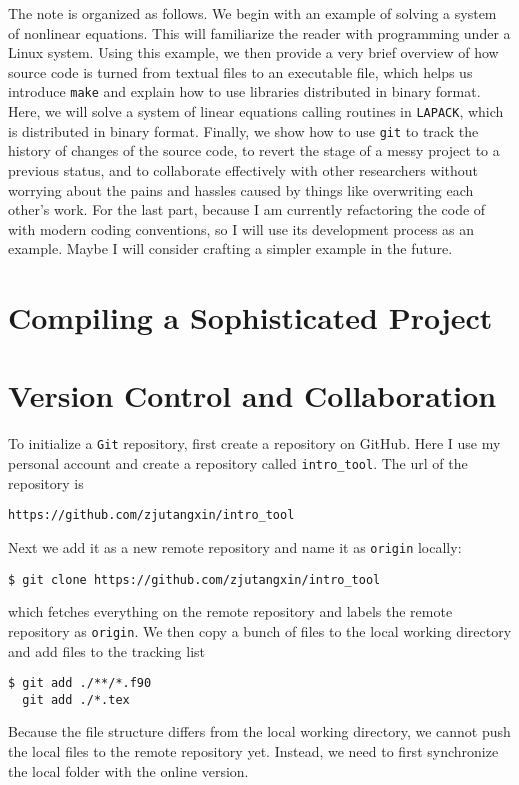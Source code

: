\documentclass[twoside,12pt,leqno]{article}
\newcommand{\code}{\texttt}
\begin{document}
The note is organized as follows. We begin with an example of solving a system of nonlinear equations. This will familiarize the reader with programming under a Linux system. Using this example, we then provide a very brief overview of how source code is turned from textual files to an executable file, which helps us introduce \code{make} and explain how to use libraries distributed in binary format. Here, we will solve a system of linear equations calling routines in \code{LAPACK}, which is distributed in binary format. Finally, we show how to use \code{git} to track the history of changes of the source code, to revert the stage of a messy project to a previous status, and to collaborate effectively with other researchers without worrying about the pains and hassles caused by things like overwriting each other's work. For the last part, because I am currently refactoring the code of \citet{Azzimontietal:2014} with modern coding conventions, so I will use its development process as an example. Maybe I will consider crafting a simpler example in the future.

\section{Compiling a Sophisticated Project}


\section{Version Control and Collaboration}

To initialize a \code{Git} repository, first create a repository on GitHub. Here I use my personal account and create a repository called \code{intro\_tool}. The url of the repository is
{\color{blue}\begin{verbatim}
https://github.com/zjutangxin/intro_tool
\end{verbatim}}
\noindent Next we add it as a new remote repository and name it as \code{origin} locally:
\begin{verbatim}
$ git clone https://github.com/zjutangxin/intro_tool
\end{verbatim}
which fetches everything on the remote repository and labels the remote repository as \code{origin}. We then copy a bunch of files to the local working directory and add files to the tracking list
\begin{verbatim}
$ git add ./**/*.f90
  git add ./*.tex
\end{verbatim}

Because the file structure differs from the local working directory, we cannot push the local files to the remote repository yet. Instead, we need to first synchronize the local folder with the online version.





\end{document}
